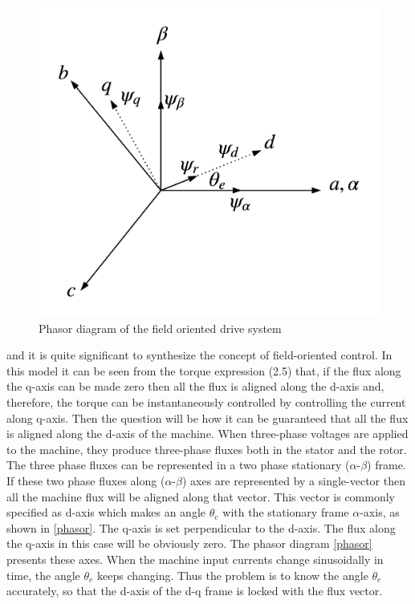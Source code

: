 \begin{figure}[h]
\centering
\includegraphics[scale=0.65]{chapter0/phasordig}
\caption{Phasor diagram of the field oriented drive system}
\label{phasor}
\end{figure}

and it is quite significant to synthesize the concept of field-oriented control. In this model it can be seen from the torque expression (2.5) that, if the flux along the q-axis
can be made zero then all the flux is aligned along the d-axis and, therefore, the torque can be instantaneously controlled by controlling the current along q-axis. Then the question will be how it can be guaranteed that all the flux is aligned along the d-axis of the machine. When three-phase voltages are applied to the machine, they produce three-phase fluxes both in the stator and the rotor. The three phase fluxes can be represented in a two phase stationary ($\alpha$-$\beta$) frame. If these two phase fluxes along ($\alpha$-$\beta$) axes are represented by a single-vector then all the machine flux will be aligned along that vector. This vector is commonly specified as d-axis which makes an angle $\theta_{e}$ with the stationary frame $\alpha$-axis, as shown in \autoref{phasor}. The q-axis is set perpendicular to the d-axis. The flux along the q-axis in this case will be obviously zero. The phasor diagram \autoref{phasor} presents these axes. When the machine input currents change sinusoidally in time, the angle $\theta_{e}$ keeps changing. Thus the problem is to know the angle $\theta_{e}$ accurately, so that the d-axis of the d-q frame is locked with the flux vector.\\


